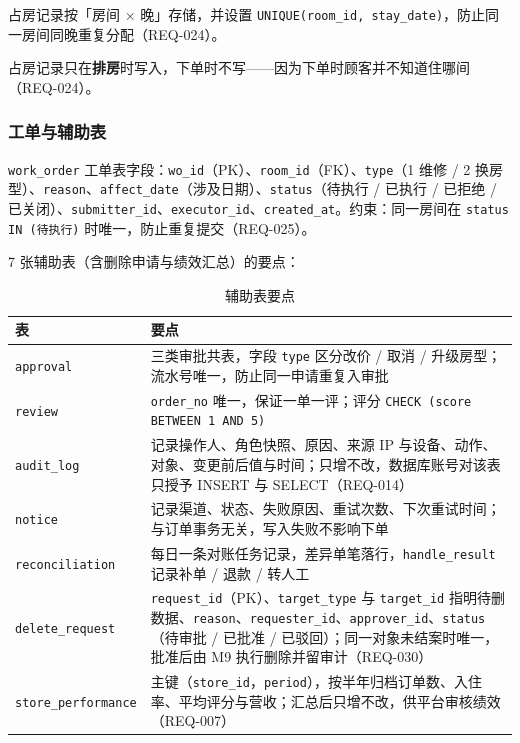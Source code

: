 占房记录按「房间 $\times$ 晚」存储，并设置 \texttt{UNIQUE(room\_id, stay\_date)}，防止同一房间同晚重复分配（REQ-024）。

占房记录只在\textbf{排房}时写入，下单时不写——因为下单时顾客并不知道住哪间（REQ-024）。

\subsubsection{工单与辅助表}

\texttt{work\_order} 工单表字段：\texttt{wo\_id}（PK）、\texttt{room\_id}（FK）、\texttt{type}（1 维修 / 2 换房型）、\texttt{reason}、\texttt{affect\_date}（涉及日期）、\texttt{status}（待执行 / 已执行 / 已拒绝 / 已关闭）、\texttt{submitter\_id}、\texttt{executor\_id}、\texttt{created\_at}。约束：同一房间在 \texttt{status IN (待执行)} 时唯一，防止重复提交（REQ-025）。

7 张辅助表（含删除申请与绩效汇总）的要点：

\begin{table}[H]
\centering
\caption{辅助表要点}
\tabfont
\begin{tabularx}{\textwidth}{@{}p{3.5cm}X@{}}
\toprule
表 & 要点 \\
\midrule
\texttt{approval} & 三类审批共表，字段 \texttt{type} 区分改价 / 取消 / 升级房型；流水号唯一，防止同一申请重复入审批 \\[2pt]
\texttt{review} & \texttt{order\_no} 唯一，保证一单一评；评分 \texttt{CHECK (score BETWEEN 1 AND 5)} \\[2pt]
\texttt{audit\_log} & 记录操作人、角色快照、原因、来源 IP 与设备、动作、对象、变更前后值与时间；只增不改，数据库账号对该表只授予 INSERT 与 SELECT（REQ-014） \\[2pt]
\texttt{notice} & 记录渠道、状态、失败原因、重试次数、下次重试时间；与订单事务无关，写入失败不影响下单 \\[2pt]
\texttt{reconciliation} & 每日一条对账任务记录，差异单笔落行，\texttt{handle\_result} 记录补单 / 退款 / 转人工 \\[2pt]
\texttt{delete\_request} & \texttt{request\_id}（PK）、\texttt{target\_type} 与 \texttt{target\_id} 指明待删数据、\texttt{reason}、\texttt{requester\_id}、\texttt{approver\_id}、\texttt{status}（待审批 / 已批准 / 已驳回）；同一对象未结案时唯一，批准后由 M9 执行删除并留审计（REQ-030） \\[2pt]
\texttt{store\_performance} & 主键（\texttt{store\_id}，\texttt{period}），按半年归档订单数、入住率、平均评分与营收；汇总后只增不改，供平台审核绩效（REQ-007） \\
\bottomrule
\end{tabularx}
\end{table}

